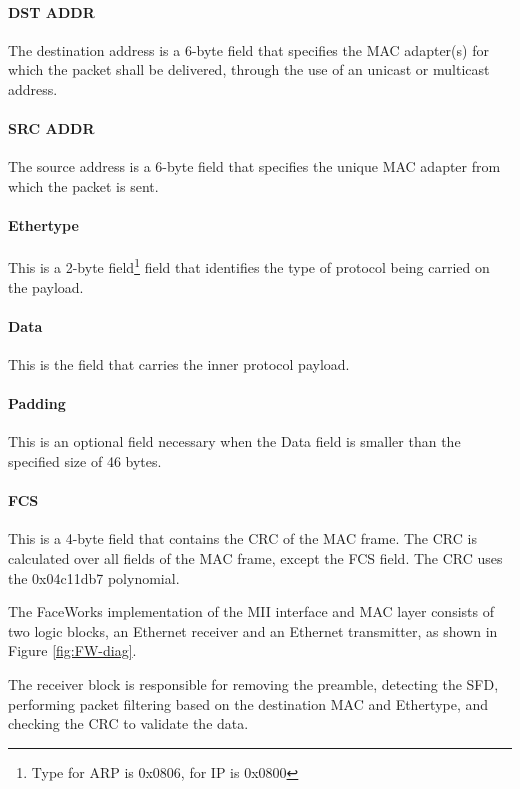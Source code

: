 \documentclass[defaultstyle,10pt,master,Helvetica]{thesis}
\begin{document}
\paragraph*{DST ADDR} The destination address is a 6-byte field that specifies the \ac{MAC} adapter(s) for which the packet shall be delivered, through the use of an unicast or multicast address.

\paragraph*{SRC ADDR} The source address is a 6-byte field that specifies the unique \ac{MAC} adapter from which the packet is sent.

\paragraph*{Ethertype} This is a 2-byte field\footnote{Type for ARP is 0x0806, for \ac{IP} is 0x0800} field that identifies the type of protocol being carried on the payload.

\paragraph*{Data} This is the field that carries the inner protocol payload.

\paragraph*{Padding} This is an optional field necessary when the Data field is smaller than the specified size of 46 bytes.

\paragraph*{FCS} This is a 4-byte field that contains the \acf{CRC} of the \ac{MAC} frame. The \ac{CRC} is calculated over all fields of the \ac{MAC} frame, except the \ac{FCS} field. The \ac{CRC} uses the 0x04c11db7 polynomial.

The FaceWorks implementation of the \ac{MII} interface and \ac{MAC} layer consists of two logic blocks, an Ethernet receiver and an Ethernet transmitter, as shown in Figure \ref{fig:FW-diag}.

The receiver block is responsible for removing the preamble, detecting the \ac{SFD}, performing packet filtering based on the destination \ac{MAC} and Ethertype, and checking the \ac{CRC} to validate the data.
\end{document}
